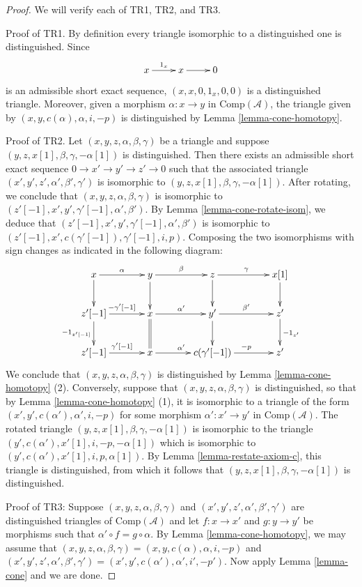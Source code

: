 \documentclass{stacks-project}
\theoremstyle{plain}
\theoremstyle{definition}
\theoremstyle{remark}
\numberwithin{equation}{subsection}
\begin{document}
\begin{proof}
We will verify each of TR1, TR2, and TR3. 

\medskip\noindent
Proof of TR1. By definition every triangle isomorphic to a distinguished
one is distinguished. Since
$$
\xymatrix{x\ar[r]^{1_x} & x\ar[r] & 0}
$$
is an admissible short exact sequence, $(x, x, 0, 1_x, 0, 0)$
is a distinguished triangle. Moreover, given a morphism
$\alpha : x \to y$ in $\text{Comp}(\mathcal{A})$, the triangle
given by $(x, y, c(\alpha), \alpha, i, -p)$ is distinguished by
Lemma \ref{lemma-cone-homotopy}.

\medskip\noindent
Proof of TR2. Let $(x,y,z,\alpha,\beta,\gamma)$ be a triangle and
suppose $(y,z,x[1],\beta,\gamma,-\alpha[1])$ is distinguished.
Then there exists an admissible short exact sequence
$0 \to x' \to y' \to z' \to 0$ such that the associated triangle
$(x',y',z',\alpha',\beta',\gamma')$ is isomorphic to
$(y,z,x[1],\beta,\gamma,-\alpha[1])$. After rotating, we conclude
that $(x,y,z,\alpha,\beta,\gamma)$ is isomorphic to
$(z'[-1],x',y', \gamma'[-1], \alpha',\beta')$. By
Lemma \ref{lemma-cone-rotate-isom},
we deduce that $(z'[-1],x',y', \gamma'[-1], \alpha',\beta')$ is
isomorphic to $(z'[-1],x',c(\gamma'[-1]), \gamma'[-1], i, p)$.
Composing the two isomorphisms with sign changes as indicated in
the following diagram:
$$
\xymatrix@C=3pc{
x\ar[r]^{\alpha}\ar[d] &
y\ar[r]^{\beta}\ar[d] &
z\ar[r]^{\gamma}\ar[d] &
x[1]\ar[d] \\
z'[-1]\ar[r]^{-\gamma'[-1]}\ar[d]_{-1_{z'[-1]}} &
x \ar[r]^{\alpha'}\ar@{=}[d] &
y' \ar[r]^{\beta'} \ar[d] &
z'\ar[d]^{-1_{z'}} \\
z'[-1]\ar[r]^{\gamma'[-1]} &
x \ar[r]^{\alpha'} &
c(\gamma'[-1]) \ar[r]^{-p} &
z'
}
$$
We conclude that $(x,y,z,\alpha,\beta,\gamma)$ is distinguished by
Lemma \ref{lemma-cone-homotopy} (2). Conversely, suppose that
$(x,y,z,\alpha,\beta,\gamma)$ is distinguished, so that by
Lemma \ref{lemma-cone-homotopy} (1), it is isomorphic to a
triangle of the form $(x',y', c(\alpha'), \alpha', i, -p)$
for some morphism $\alpha': x' \to y'$ in $\text{Comp}(\mathcal{A})$.
The rotated triangle $(y,z,x[1],\beta,\gamma, -\alpha[1])$ is
isomorphic to the triangle $(y',c(\alpha'), x'[1], i, -p, -\alpha[1])$
which is isomorphic to $(y',c(\alpha'), x'[1], i, p, \alpha[1])$.
By Lemma \ref{lemma-restate-axiom-c}, this triangle is distinguished,
from which it follows that $(y,z,x[1], \beta,\gamma, -\alpha[1])$
is distinguished.

\medskip\noindent
Proof of TR3: Suppose $(x,y,z, \alpha,\beta,\gamma)$ and
$(x',y',z',\alpha',\beta',\gamma')$ are distinguished triangles
of $\text{Comp}(\mathcal{A})$ and let $f: x \to x'$ and
$g: y \to y'$ be morphisms such that
$\alpha' \circ f = g \circ \alpha$. By
Lemma \ref{lemma-cone-homotopy}, we may assume that
$(x,y,z,\alpha,\beta,\gamma)= (x,y,c(\alpha),\alpha, i, -p)$
and $(x',y',z', \alpha',\beta',\gamma')= (x',y',c(\alpha'), \alpha',i',-p')$.
Now apply Lemma \ref{lemma-cone}
and we are done.
\end{proof}
\end{document}
